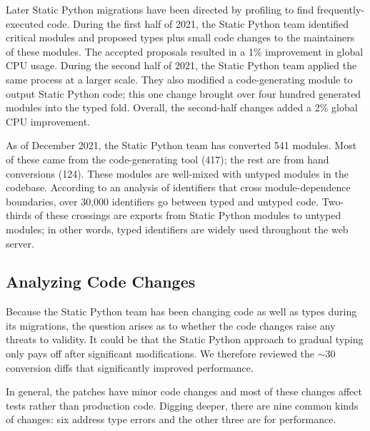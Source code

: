 \documentclass[english,cleveref,submission]{programming}
\newcommand{\SP}{Static Python}
\begin{document}
Later \SP{} migrations have been directed by profiling to find frequently-executed code.
During the first half of 2021, the \SP{} team identified critical
modules and proposed types plus small code changes to the maintainers of these modules.
The accepted proposals resulted in a 1\% improvement in global CPU usage.
During the second half of 2021, the \SP{} team applied the same
process at a larger scale.
They also modified a code-generating module to output \SP{} code;
this one change brought over four hundred generated modules into the typed fold.
Overall, the second-half changes added a 2\% global CPU improvement.

As of December 2021, the \SP{} team has converted 541 modules.
Most of these came from the code-generating tool (417); the rest
are from hand conversions (124).
These modules are well-mixed with untyped modules in the codebase.
According to an analysis of identifiers that cross module-dependence
boundaries, over 30,000 identifiers go between typed and untyped code.
Two-thirds of these crossings are exports from \SP{} modules
to untyped modules; in other words, typed identifiers are widely used
throughout the web server.



\subsection{Analyzing Code Changes}

Because the \SP{} team has been changing code as well as types during its
migrations, the question arises as to whether the code changes raise any
threats to validity.
It could be that the \SP{} approach to gradual typing only pays off
after significant modifications.
We therefore reviewed the $\sim 30$ conversion diffs that significantly improved
performance.

In general, the patches have minor code changes and most of these changes
affect tests rather than production code.
Digging deeper, there are nine common kinds of changes: six address
type errors and the other three are for performance.
\end{document}
